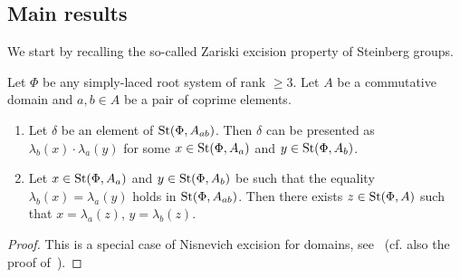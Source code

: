 \subsection{Main results}

We start by recalling the so-called Zariski excision property of Steinberg groups.
\begin{lemma} \label{lem:zariski-glueing}
Let $\Phi$ be any simply-laced root system of rank $\geq 3$.
Let $A$ be a commutative domain and $a, b \in A$ be a pair of coprime elements.
\begin{enumerate}
    \item Let $\delta$ be an element of $\operatorname{St}(\Phi, A_{ab})$.
    Then $\delta$ can be presented as $\lambda_b(x) \cdot \lambda_a(y)$ for some
    $x  \in \operatorname{St}(\Phi, A_a)$ and $y \in \operatorname{St}(\Phi, A_b)$.
    \item  Let $x \in \operatorname{St}(\Phi, A_a)$ and $y \in \operatorname{St}(\Phi, A_b)$ be such that the equality $\lambda_b(x) = \lambda_a(y)$ holds in $\operatorname{St}(\Phi, A_{ab})$.
    Then there exists $z \in \operatorname{St}(\Phi, A)$ such that $x = \lambda_a(z)$, $y = \lambda_b(z)$.
\end{enumerate}
\end{lemma}
\begin{proof}
    This is a special case of Nisnevich excision for domains, see~\cite[Proposition~4.5]{LSV2}
    (cf. also the proof of~\cite[Lemma~2.6]{LSV2}).
\end{proof}


